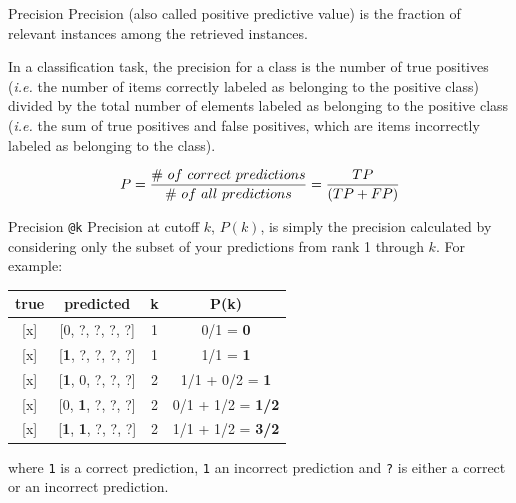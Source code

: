 \begin{frame}[c]{Precision}
    Precision (also called positive predictive value) is the fraction of
    relevant instances among the retrieved instances.
    
    In a classification task, the precision for a class is the number of
    true positives (\emph{i.e.} the number of items correctly labeled as belonging
    to the positive class) divided by the total number of elements labeled
    as belonging to the positive class (\emph{i.e.} the sum of true positives and
    false positives, which are items incorrectly labeled as belonging to the
    class).
    
    $$P = { \#\ of\ correct\ predictions\over \#\ of\ all\ predictions  } = {TP \over (TP + FP)}$$
\end{frame}

\begin{frame}[c]{Precision \texttt{@k}}
    Precision at cutoff $k$, $P(k)$, is simply the precision
    calculated by considering only the subset of your predictions from rank
    1 through $k$. For example:
    
    \begin{longtable}[]{@{}cccc@{}}
    \toprule
    true & predicted & k & P(k)\tabularnewline
    \midrule
    \endhead
    {[}x{]} & {[}0, ?, ?, ?, ?{]} & 1 & 0/1 = \textbf{0}\tabularnewline
    {[}x{]} & {[}\textbf{1}, ?, ?, ?, ?{]} & 1 & 1/1 = \textbf{1}\tabularnewline
    {[}x{]} & {[}\textbf{1}, 0, ?, ?, ?{]} & 2 & 1/1 + 0/2 = \textbf{1}\tabularnewline
    {[}x{]} & {[}0, \textbf{1}, ?, ?, ?{]} & 2 & 0/1 + 1/2 = \textbf{1/2}\tabularnewline
    {[}x{]} & {[}\textbf{1}, \textbf{1}, ?, ?, ?{]} & 2 & 1/1 + 1/2 = \textbf{3/2}\tabularnewline
    \bottomrule
    \end{longtable}
    
    where \texttt{1} is a correct prediction, \texttt{1} an incorrect prediction and \texttt{?} is either a correct or an incorrect prediction.
\end{frame}


